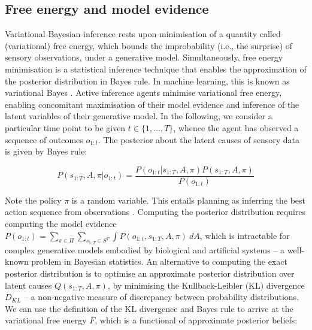 \documentclass[review,12pt,authoryear]{elsarticle}
\begin{document}
\subsection{Free energy and model evidence}

Variational Bayesian inference rests upon minimisation of a quantity called (variational) free energy, which bounds the improbability (i.e., the surprise) of sensory observations, under a generative model. Simultaneously, free energy minimisation is a statistical inference technique that enables the approximation of the posterior distribution in Bayes rule. In machine learning, this is known as variational Bayes \citep{bishopPatternRecognitionMachine2006,jordanIntroductionVariationalMethods1998,bealVariationalAlgorithmsApproximate2003,bleiVariationalInferenceReview2017}. Active inference agents minimise variational free energy, enabling concomitant maximisation of their model evidence and inference of the latent variables of their generative model. In the following, we consider a particular time point to be given $t\in\{1,...,T\}$, whence the agent has observed a sequence of outcomes $o_{1:t}$. The posterior about the latent causes of sensory data is given by Bayes rule:
  	
  	\begin{equation}
  	\label{eq:bayes rule}
  	    P(s_{1:T}, A, \pi |o_{1:t})= \frac{P(o_{1:t} |s_{1:T}, A, \pi )P(s_{1:T}, A, \pi )}{P(o_{1:t})}
  	\end{equation}
  		
  		
Note the policy $\pi$ is a random variable. This entails planning as inferring the best action sequence from observations \citep{attiasPlanningProbabilisticInference2003,botvinickPlanningInference2012}. Computing the posterior distribution requires computing the model evidence $P(o_{1:t})=\sum_{\pi \in \Pi }\sum_{s_{1:T}\in S^T}\int P(o_{1:t} ,s_{1:T}, A, \pi ) \: dA$, which is intractable for complex generative models embodied by biological and artificial systems \citep{fristonHierarchicalModelsBrain2008} -- a well-known problem in Bayesian statistics.
An alternative to computing the exact posterior distribution is to optimise an approximate posterior distribution over latent causes $Q(s_{1:T}, A, \pi)$, by minimising the Kullback-Leibler (KL) divergence \citep{kullbackInformationSufficiency1951} $D_{KL}$ -- a non-negative measure of discrepancy between probability distributions. We can use the definition of the KL divergence and Bayes rule to arrive at the variational free energy $F$, which is a functional of approximate posterior beliefs:
\end{document}
